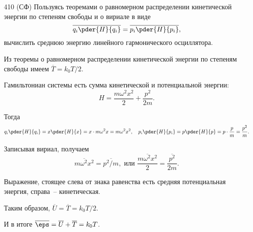 \documentclass[pscyr]{hedwork}
\begin{document}
  \begin{task}{410 (СФ)}{
    Пользуясь теоремами о равномерном распределении кинетической энергии по
    степеням свободы и о вириале в виде
    \[
      \overline{q_i\pder{H}{q_i}} = \overline{p_i\pder{H}{p_i}},
    \]
    вычислить среднюю энергию линейного гармонического осциллятора.
  }

    Из теоремы о равномерном распределении кинетической энергии по степеням
    свободы имеем \( \overline{T} = k_0T / 2 \).
    
    Гамильтониан системы есть сумма кинетической и потенциальной энергии:
    \[
      H = \frac{m\omega^2x^2}{2} + \frac{p^2}{2m}.
    \]
    
    Тогда
    \[
      q_i\pder{H}{q_i} = x\pder{H}{x} = x\cdot m\omega^2x = m\omega^2x^2, \quad
        p_i\pder{H}{p_i} = p\pder{H}{p} = p\cdot\frac{p}{m} = \frac{p^2}{m}.
    \]
    
    Записывая вириал, получаем
    \[
      \overline{m\omega^2x^2} = \overline{p^2 / m}, \text{ или }
        \overline{\frac{m\omega^2x^2}{2}} = \overline{\frac{p^2}{2m}}.
    \]
    
    Выражение, стоящее слева от знака равенства есть средняя потенциальная
    энергия, справа~-- кинетическая.
    
    Таким образом, \( \overline{U} = \overline{T} = k_0 T / 2 \).
    
    И в итоге \( \overline{\eps} = \overline{U} + \overline{T} = k_0 T \).

  \end{task}
\end{document}
